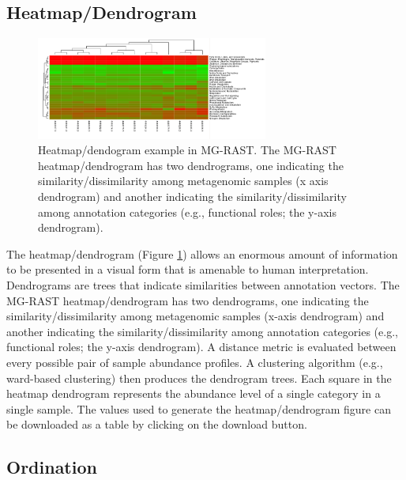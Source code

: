 \documentclass[12pt,fullpage]{report}
\begin{document}

\subsection{Heatmap/Dendrogram}

\begin{figure}
\begin{center}
\includegraphics[width=3in]{Images/heatmap.png}
\end{center}
\caption{
Heatmap/dendogram example in MG-RAST. The MG-RAST heatmap/dendrogram has two dendrograms, one indicating the similarity/dissimilarity among metagenomic samples (x axis dendrogram) and another indicating the similarity/dissimilarity among annotation categories (e.g., functional roles; the y-axis dendrogram).
}
\label{fig:heatmap}
\end{figure}


The heatmap/dendrogram (Figure \ref{fig:heatmap}) allows an enormous amount of information to be presented in a visual form that is amenable to human interpretation. Dendrograms are trees that indicate similarities between annotation vectors. The MG-RAST heatmap/dendrogram has two dendrograms, one indicating the similarity/dissimilarity among metagenomic samples (x-axis dendrogram) and another indicating the similarity/dissimilarity among annotation categories (e.g., functional roles; the y-axis dendrogram). A distance metric is evaluated between every possible pair of sample abundance profiles. A clustering algorithm (e.g., ward-based clustering) then produces the dendrogram trees. Each square in the heatmap dendrogram represents the abundance level of a single category in a single sample. The values used to generate the heatmap/dendrogram figure can be downloaded as a table by clicking on the download button.

\subsection{Ordination}
\end{document}
